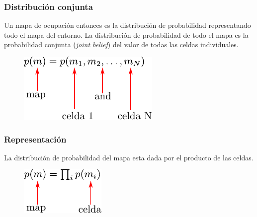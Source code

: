 \begin{frame}
    \frametitle{Distribución conjunta}
    
    Un mapa de ocupación entonces es la distribución de probabilidad representando todo el mapa del entorno. La distribución de probabilidad de todo el mapa es la probabilidad conjunta (\emph{joint belief}) del valor de todas las celdas individuales.
    
   	\begin{figure}[!h]
    	\includegraphics[width=0.5\columnwidth]{./images/joint_distribution.pdf}
    \end{figure}
    
\end{frame}

\begin{frame}
    \frametitle{Representación}
    La distribución de probabilidad del mapa esta dada por el producto de las celdas.
    
   	\begin{figure}[!h]
    	\includegraphics[width=0.3\columnwidth]{./images/map_probability_distribution.pdf}
    \end{figure}
    
\end{frame}

